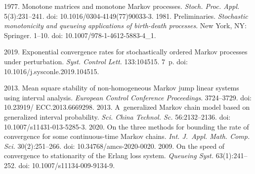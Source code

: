   \begin{multicols}{2}

\renewcommand{\bibname}{\protect\rmfamily References}

{\small\frenchspacing
 {\baselineskip=10.5pt
 \begin{thebibliography}{9}
 
 \vspace*{-3pt}

 1977. Monotone matrices and monotone Markov processes. 
 \textit{Stoch. Proc. Appl.} 5(3):231--241. doi: 10.1016/0304-4149(77)90033-3.
 1981. Preliminaries. \textit{Stochastic monotonicity and queueing applications of birth-death processes}. 
 New York, NY: Springer. 1--10. doi: 10.1007/978-1-4612-5883-4\_1.
 
 2019. Exponential convergence rates for stochastically ordered Markov processes under 
 perturbation. \textit{Syst. Control Lett.} 133:104515. 7~p. doi: 10.1016/j.sysconle.2019.104515.
 
 2013. Mean square stability of non-homogeneous Markov jump linear systems using interval analysis. 
 \textit{European Control Conference Proceedings}. 3724--3729. doi: 10.23919/ ECC.2013.6669298.
 2013. A~generalized Markov chain model based on generalized interval probability. 
 \textit{Sci. China Technol. Sc.} 56:2132--2136. doi: 10.1007/s11431-013-5285-3.
 2020. On the three methods for bounding the rate of convergence for some continuous-time Markov chains. 
 \textit{Int. J.~Appl. Math. Comp. Sci.} 30(2):251--266. doi: 10.34768/amcs-2020-0020.
  2009. On the speed of convergence to stationarity 
of the Erlang loss system. \textit{Queueing Syst.} 63(1):241--252. doi: 10.1007/s11134-009-9134-9.

\end{thebibliography}

 }
 }

\end{multicols}

\vspace*{-6pt}

